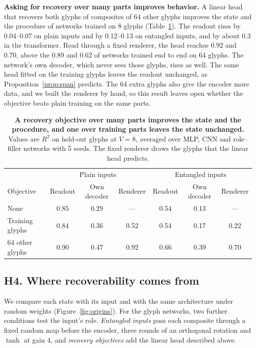 \textbf{Asking for recovery over many parts improves behavior.} A linear head that recovers both glyphs of composites of 64 other glyphs improves the state and the procedure of networks trained on 8 glyphs (Table~\ref{tab:objective}). The readout rises by 0.04--0.07 on plain inputs and by 0.12--0.13 on entangled inputs, and by about 0.3 in the transformer. Read through a fixed renderer, the head reaches 0.92 and 0.70, above the 0.89 and 0.62 of networks trained end to end on 64 glyphs. The network's own decoder, which never sees those glyphs, rises as well. The same head fitted on the training glyphs leaves the readout unchanged, as Proposition~\ref{prop:span} predicts. The 64 extra glyphs also give the encoder more data, and we built the renderer by hand, so this result leaves open whether the objective beats plain training on the same parts.

\begin{table}[t]
  \caption{\textbf{A recovery objective over many parts improves the state and the procedure, and one over training parts leaves the state unchanged.} Values are $R^2$ on held-out glyphs at $V = 8$, averaged over MLP, CNN and role--filler networks with 5 seeds. The fixed renderer draws the glyphs that the linear head predicts.}
  \label{tab:objective}
  \centering\small
  \begin{tabular}{@{}lcccccc@{}}
    \toprule
    & \multicolumn{3}{c}{Plain inputs} & \multicolumn{3}{c}{Entangled inputs} \\
    Objective & Readout & Own decoder & Renderer & Readout & Own decoder & Renderer \\
    \midrule
    None & 0.85 & 0.29 & --- & 0.54 & 0.13 & --- \\
    Training glyphs & 0.84 & 0.36 & 0.52 & 0.54 & 0.17 & 0.22 \\
    64 other glyphs & 0.90 & 0.47 & 0.92 & 0.66 & 0.39 & 0.70 \\
    \bottomrule
  \end{tabular}
\end{table}

\subsection{H4. Where recoverability comes from}
\label{sec:origins}

We compare each state with its input and with the same architecture under random weights (Figure~\ref{fig:origins}). For the glyph networks, two further conditions test the input's role. \emph{Entangled inputs} pass each composite through a fixed random map before the encoder, three rounds of an orthogonal rotation and $\tanh$ at gain 4, and \emph{recovery objectives} add the linear head described above.

